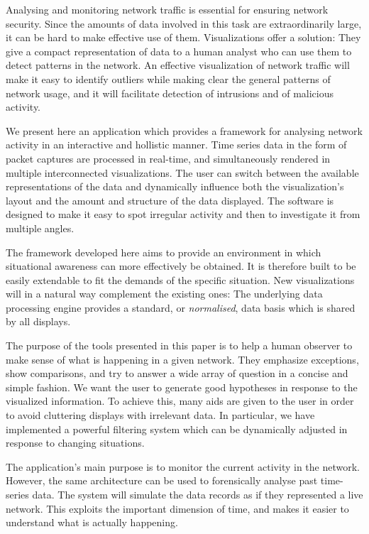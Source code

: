 Analysing and monitoring network traffic is essential for ensuring network security. Since the amounts of data involved in this task are extraordinarily large, it can be hard to make effective use of them. Visualizations offer a solution: They give a compact representation of data to a human analyst who can use them to detect patterns in the network. An effective visualization of network traffic will make it easy to identify outliers while making clear the general patterns of network usage, and it will facilitate detection of intrusions and of malicious activity. 

We present here an application which provides a framework for analysing network activity in an interactive and hollistic manner. Time series data in the form of packet captures are processed in real-time, and simultaneously rendered in multiple interconnected visualizations. The user can switch between the available representations of the data and dynamically influence both the visualization's layout and the amount and structure of the data displayed. The software is designed to make it easy to spot irregular activity and then to investigate it from multiple angles. 

The framework developed here aims to provide an environment in which situational awareness can more effectively be obtained. It is therefore built to be easily extendable to fit the demands of the specific situation. New visualizations will in a natural way complement the existing ones: The underlying data processing engine provides a standard, or \textit{normalised}, data basis which is shared by all displays.

The purpose of the tools presented in this paper is to help a human observer to make sense of what is happening in a given network. They emphasize exceptions, show comparisons, and try to answer a wide array of question in a concise and simple fashion. We want the user to generate good hypotheses in response to the visualized information. To achieve this, many aids are given to the user in order to avoid cluttering displays with irrelevant data. In particular, we have implemented a powerful filtering system which can be dynamically adjusted in response to changing situations.

The application's main purpose is to monitor the current activity in the network. However, the same architecture can be used to forensically analyse past time-series data. The system will simulate the data records as if they represented a live network. This exploits the important dimension of time, and makes it easier to understand what is actually happening.
